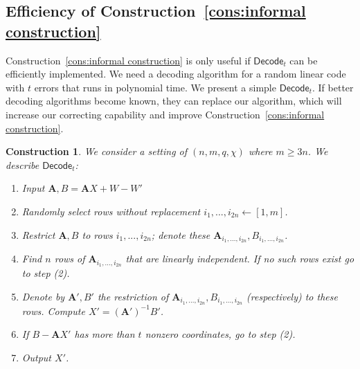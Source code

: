 \documentclass[11pt]{article}
\newcommand{\consref}[1]{\mbox{Construction~\ref{#1}}}
\newcommand{\class}[1]{{\ensuremath{\mathsf{#1}}}}
\newcommand{\rep}{\ensuremath{\class{Rep}}\xspace}
\newcommand{\vect}[1]{\ensuremath{\textbf{#1}}}
\newcommand{\Fq}{\ensuremath{\mathbb{F}_q}}
\newcommand{\sample}{\ensuremath{\class{Sample}}\xspace}
\newcommand{\decode}{\ensuremath{\mathsf{Decode}}}
\newtheorem{construction}[theorem]{Construction}
\newcommand{\vA}{\vect{A}}
\begin{document}

\subsection{Efficiency of \consref{cons:informal construction}}
\label{sec:time main construction}
\consref{cons:informal construction} is only useful if $\decode_t$ can be efficiently implemented.  We need a decoding algorithm for a random linear code with $t$ errors that runs in polynomial time.  We present a simple $\decode_t$.  If better decoding algorithms become known, they can replace our algorithm, which will increase our correcting capability and improve \consref{cons:informal construction}.


\begin{construction}
\label{cons:decoding algorithm} We consider a setting of $(n, m, q, \chi)$ where $m\geq 3n$.  We describe $\decode_t$:
\begin{enumerate}
\item Input $\vA , B = \vA X + W - W'$
\item Randomly select rows without replacement $i_1,..., i_{2n}\leftarrow [1,m]$.  
\item Restrict $\vA, B$ to rows $i_1,...,i_{2n}$; denote these $\vA_{i_1,...,i_{2n}}, B_{i_1,...,i_{2n}}$.
\item Find $n$ rows of $\vA_{i_1,..., i_{2n}}$ that are linearly independent.  
If no such rows exist go to step (2).
\item Denote by $\vA', B'$ the restriction of $\vA_{i_1,..., i_{2n}}, B_{i_1,..., i_{2n}}$ (respectively) to these rows. Compute $X' = (\vA')^{-1}B'$.  
\item If $B- \vA X'$ has more than $t$ nonzero coordinates, go to step (2).
\item Output $X'$.
\end{enumerate}
\end{construction}
\end{document}
